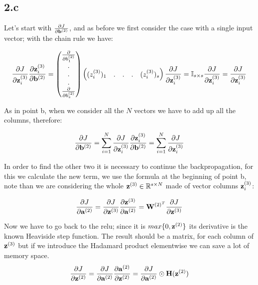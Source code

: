 \documentclass{article}
\DeclareRobustCommand{\vect}[1]{
  \ifcat#1\relax
    \boldsymbol{#1}
  \else
    \mathbf{#1}
  \fi}
\begin{document}
\subsection*{2.c}

Let's start with $\frac{\partial J}{\partial \vect{b}^{(2)}}$, and as before we first consider the case with a single input vector; with the chain rule we have:

$$
\frac{\partial J}{\partial \vect{z}_i^{(3)}} \frac{\partial \vect{z}_i^{(3)}}{\partial \vect{b}^{(2)}} =  \begin{pmatrix}
\frac{\partial }{\partial b_1^{(2)}}\\ 
.\\ 
.\\ 
.\\ 
\frac{\partial }{\partial b_s^{(2)}}
\end{pmatrix}\begin{pmatrix}
(z_i^{(3)})_1 & . &  .& . & (z_i^{(3)})_s
\end{pmatrix}\frac{\partial J}{\partial \vect{z}_i^{(3)}} = \mathbb{I}_{s \times s} \frac{\partial J}{\partial \vect{z}_i^{(3)}} = \frac{\partial J}{\partial \vect{z}_i^{(3)}}
$$

As in point b, when we consider all the $ N $ vectors we have to add up all the columns, therefore:

$$
\frac{\partial J}{\partial \vect{b}^{(2)}} = 
\sum_{i=1}^N \frac{\partial J}{\partial \vect{z}_i^{(3)}} \frac{\partial \vect{z}_i^{(3)}}{\partial \vect{b}^{(2)}} =  
\sum_{i=1}^N \frac{\partial J}{\partial \vect{z}_i^{(3)}}
$$

In order to find the other two it is necessary to continue the backpropagation, for this we calculate the new term, we use the formula at the beginning of point b, note than we are considering the whole $\vect{z}^{(3)} \in \mathbb{R}^{s \times N}$ made of vector columns $\vect{z}_i^{(3)}$:

$$
 \frac{\partial J}{\partial \vect{a}^{(2)}} = \frac{\partial J}{\partial \vect{z}^{(3)}}\frac{\partial \vect{z}^{(3)}}{\partial \vect{a}^{(2)}} =  \vect{W}^{(2)^T}\frac{\partial J}{\partial \vect{z}^{(3)}}

$$

Now we have to go back to the relu; since it is $ max \{0, \vect{z}^{(2)}\} $ its derivative is the known Heaviside step function. The result should be a matrix, for each column of $\vect{z}^{(3)}$ but if we introduce the Hadamard product elementwise we can save a lot of memory space.
$$
\frac{\partial J}{\partial \vect{z}^{(2)}} = \frac{\partial J}{\partial \vect{a}^{(2)}}\frac{\partial \vect{a}^{(2)}}{\partial \vect{z}^{(2)}} = \frac{\partial J}{\partial \vect{a}^{(2)}} \odot \vect{H}(\vect{z}^{(2)})
$$
\end{document}
